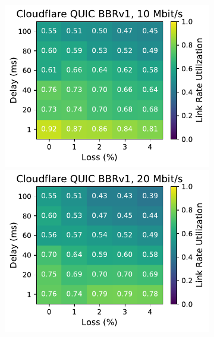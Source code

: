 \begin{figure}[ht]
\begin{subfigure}[b]{0.22\linewidth}
        \includegraphics[width=\linewidth,trim={0 0 2cm 0},clip]{splitting/figures/heatmaps/heatmap_quiche_bbr1_10mbps.pdf}
        \includegraphics[width=\linewidth,trim={0 0 2cm 0},clip]{splitting/figures/heatmaps/heatmap_quiche_bbr1_20mbps.pdf}

\end{subfigure}
\end{figure}
